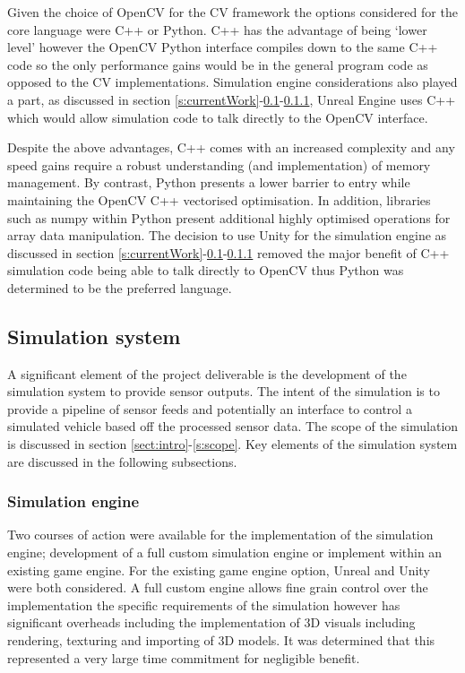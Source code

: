 \documentclass[]{aiaa-tc}%
\begin{document}
Given the choice of OpenCV for the CV framework the options considered for the core language were C++ or Python. C++ has the advantage of being `lower level' however the OpenCV Python interface compiles down to the same C++ code so the only performance gains would be in the general program code as opposed to the CV implementations. Simulation engine considerations also played a part, as discussed in section \ref{s:currentWork}-\ref{s:simSystem}-\ref{s:simEngineChoice}, Unreal Engine uses C++ which would allow simulation code to talk directly to the OpenCV interface.

Despite the above advantages, C++ comes with an increased complexity and any speed gains require a robust understanding (and implementation) of memory management. By contrast, Python presents a lower barrier to entry while maintaining the OpenCV C++ vectorised optimisation. In addition, libraries such as numpy within Python present additional highly optimised operations for array data manipulation. The decision to use Unity for the simulation engine as discussed in section \ref{s:currentWork}-\ref{s:simSystem}-\ref{s:simEngineChoice} removed the major benefit of C++ simulation code being able to talk directly to OpenCV thus Python was determined to be the preferred language.

\subsection{Simulation system}\label{s:simSystem}

A significant element of the project deliverable is the development of the simulation system to provide sensor outputs. The intent of the simulation is to provide a pipeline of sensor feeds and potentially an interface to control a simulated vehicle based off the processed sensor data. The scope of the simulation is discussed in section \ref{sect:intro}-\ref{s:scope}. Key elements of the simulation system are discussed in the following subsections.


\subsubsection{Simulation engine} \label{s:simEngineChoice}

Two courses of action were available for the implementation of the simulation engine; development of a full custom simulation engine or implement within an existing game engine. For the existing game engine option, Unreal and Unity were both considered. A full custom engine allows fine grain control over the implementation the specific requirements of the simulation however has significant overheads including the implementation of 3D visuals including rendering, texturing and importing of 3D models. It was determined that this represented a very large time commitment for negligible benefit.
\end{document}

